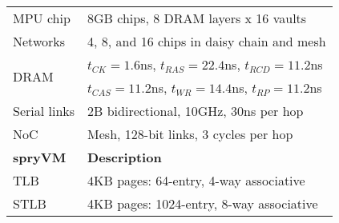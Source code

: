 \begin{table}
\begin{center}
{\begin{tabular}{ l  l }
				
				\multirow{1}{*}{MPU chip}                                   &  8GB chips, 8 DRAM layers x 16 vaults \\         
				\cmidrule{2-2}
				\multirow{1}{*}{Networks}                             &  4, 8, and 16 chips in daisy chain and mesh \\       
				\cmidrule{2-2}
				\multirow{2}{*}{DRAM}                                &  $t_{CK} = 1.6$ns, $t_{RAS} = 22.4$ns, $t_{RCD} = 11.2$ns \\
				&  $t_{CAS} = 11.2$ns, $t_{WR} = 14.4$ns, $t_{RP} = 11.2$ns \\ 
				\cmidrule{2-2}
				\multirow{1}{*}{Serial links}                             &  2B bidirectional, 10GHz, 30ns per hop~\cite{kanter:cavium, towles:unifying} \\           
				\cmidrule{2-2}
				\multirow{1}{*}{NoC}                             &  Mesh, 128-bit links, 3 cycles per hop \\
				
				\toprule
				{\bf spryVM}                  & {\bf Description}  \\
				\toprule
				\multirow{1}{*}{TLB}	& $4$KB pages: 64-entry, 4-way associative \\
				\cmidrule{2-2}
				\multirow{1}{*}{STLB} 			& 4KB pages: 1024-entry, 8-way associative \\ 
				
				
				\bottomrule
			\end{tabular}
		} %
	\end{center}
	\vspace{-0.1in}
\end{table}